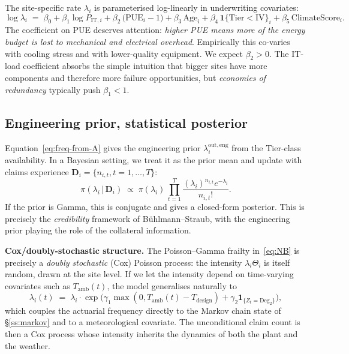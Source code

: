 \documentclass[11pt,a4paper]{article}
\theoremstyle{ia}
\newcommand{\1}{\mathbf{1}}
\newcommand{\given}{\,\vert\,}
\begin{document}
The site-specific rate $\lambda_i$ is parameterised log-linearly in
underwriting covariates:
\begin{equation}\label{eq:GLM}
   \log \lambda_i \;=\; \beta_0
   + \beta_1 \log P_{\mathrm{IT},i}
   + \beta_2 \,\bigl(\mathrm{PUE}_i - 1\bigr)
   + \beta_3 \,\mathrm{Age}_i
   + \beta_4 \,\1\{\mathrm{Tier}<\mathrm{IV}\}_i
   + \beta_5 \,\mathrm{ClimateScore}_i .
\end{equation}
The coefficient on PUE deserves attention: \emph{higher PUE means more
of the energy budget is lost to mechanical and electrical overhead}.
Empirically this co-varies with cooling stress and with lower-quality
equipment. We expect $\beta_2 > 0$. The IT-load coefficient absorbs
the simple intuition that bigger sites have more components and
therefore more failure opportunities, but \emph{economies of redundancy}
typically push $\beta_1 < 1$.

\subsection{Engineering prior, statistical posterior}

Equation~\eqref{eq:freq-from-A} gives the engineering prior
$\lambda_i^{\mathrm{out},\mathrm{eng}}$ from the Tier-class
availability. In a Bayesian setting, we treat it as the prior mean and
update with claims experience $\mathbf{D}_i=\{n_{i,t},t=1,\dots,T\}$:
\begin{equation}\label{eq:bayes}
   \pi(\lambda_i \given \mathbf{D}_i)
   \;\propto\; \pi(\lambda_i)\,\prod_{t=1}^{T}
   \frac{(\lambda_i)^{n_{i,t}} e^{-\lambda_i}}{n_{i,t}!} .
\end{equation}
If the prior is Gamma, this is conjugate and gives a closed-form
posterior. This is precisely the \emph{credibility} framework of
B\"uhlmann--Straub, with the engineering prior playing the role of
the collateral information.

\clearpage
\begin{rbox}
\textbf{Cox/doubly-stochastic structure.} The Poisson--Gamma frailty
in~\eqref{eq:NB} is precisely a \emph{doubly stochastic} (Cox) Poisson
process: the intensity $\lambda_i\Theta_i$ is itself random, drawn at
the site level. If we let the intensity depend on time-varying
covariates such as $T_{\mathrm{amb}}(t)$, the model generalises naturally to
\begin{equation*}
   \lambda_i(t) \;=\; \lambda_i \cdot
   \exp\!\bigl(\gamma_1 \max(0,T_{\mathrm{amb}}(t)-T_{\mathrm{design}})
              + \gamma_2 \1_{\{Z_t=\mathrm{Deg}_2\}}\bigr),
\end{equation*}
which couples the actuarial frequency directly to the Markov chain
state of \S\ref{ss:markov} and to a meteorological covariate. The
unconditional claim count is then a Cox process whose intensity
inherits the dynamics of both the plant and the weather.
\end{rbox}
\end{document}
